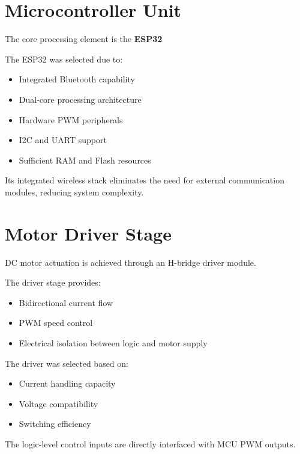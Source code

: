 \section{Microcontroller Unit}

The core processing element is the \textbf{ESP32}

The ESP32 was selected due to:

\begin{itemize}
	\item Integrated Bluetooth capability
	\item Dual-core processing architecture
	\item Hardware PWM peripherals
	\item I2C and UART support
	\item Sufficient RAM and Flash resources
\end{itemize}

Its integrated wireless stack eliminates the need for external communication modules, reducing system complexity.


\section{Motor Driver Stage}

DC motor actuation is achieved through an H-bridge driver module.

The driver stage provides:

\begin{itemize}
	\item Bidirectional current flow
	\item PWM speed control
	\item Electrical isolation between logic and motor supply
\end{itemize}

The driver was selected based on:

\begin{itemize}
	\item Current handling capacity
	\item Voltage compatibility
	\item Switching efficiency
\end{itemize}

The logic-level control inputs are directly interfaced with MCU PWM outputs.


